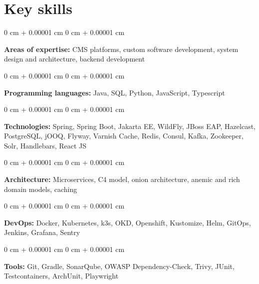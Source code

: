 \documentclass[10pt, letterpaper]{article}
\newenvironment{onecolentry}{
  \begin{adjustwidth}{
      0 cm + 0.00001 cm
    }{
      0 cm + 0.00001 cm
    }
  }{
  \end{adjustwidth}
} %
\begin{document}

\section{Key skills}

\begin{onecolentry}
  \textbf{Areas of expertise:} CMS platforms, custom software
  development, system design and architecture, backend development
\end{onecolentry}

\vspace{0.05 cm}

\begin{onecolentry}
  \textbf{Programming languages:} Java, SQL, Python,
  JavaScript, Typescript
\end{onecolentry}

\vspace{0.05 cm}

\begin{onecolentry}
  \textbf{Technologies:} Spring, Spring Boot, Jakarta EE, WildFly,
  JBoss EAP, Hazelcast, PostgreSQL, jOOQ, Flyway, Varnish Cache,
  Redis, Consul, Kafka, Zookeeper, Solr, Handlebars, React JS
\end{onecolentry}

\vspace{0.05 cm}

\begin{onecolentry}
  \textbf{Architecture:} Microservices, C4 model, onion architecture,
  anemic and rich domain models, caching
\end{onecolentry}

\vspace{0.05 cm}

\begin{onecolentry}
  \textbf{DevOps:} Docker, Kubernetes, k3s, OKD, Openshift,
  Kustomize, Helm, GitOps, Jenkins, Grafana, Sentry
\end{onecolentry}

\vspace{0.05 cm}

\begin{onecolentry}
  \textbf{Tools:} Git, Gradle, SonarQube, OWASP Dependency-Check, Trivy,
  JUnit, Testcontainers, ArchUnit, Playwright
\end{onecolentry}
\end{document}
